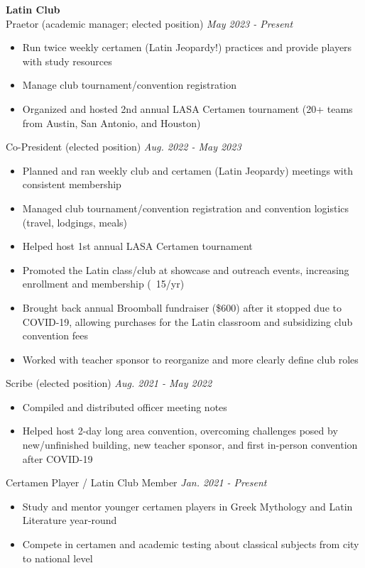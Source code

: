 \documentclass{article}
\begin{document}
\begin{flushleft}
    \textbf{Latin Club}\\
    Praetor (academic manager; elected position) \hfill \textsl{May 2023 - Present}
    \begin{itemize}
        \setlength\itemsep{-0.2em}
        \item Run twice weekly certamen (Latin Jeopardy!) practices and provide players with study resources
        \item Manage club tournament/convention registration
        \item Organized and hosted 2nd annual LASA Certamen tournament (20+ teams from Austin, San Antonio, and Houston)
    \end{itemize}
    Co-President (elected position) \hfill \textsl{Aug. 2022 - May 2023}
    \begin{itemize}
        \setlength\itemsep{-.2em}
        \item Planned and ran weekly club and certamen (Latin Jeopardy) meetings with consistent membership
        \item Managed club tournament/convention registration and convention logistics (travel, lodgings, meals)
        \item Helped host 1st annual LASA Certamen tournament
        \item Promoted the Latin class/club at showcase and outreach events, increasing enrollment and membership (~15/yr)
        \item Brought back annual Broomball fundraiser (\$600) after it stopped due to COVID-19, allowing purchases for the Latin classroom and subsidizing club convention fees
        \item Worked with teacher sponsor to reorganize and more clearly define club roles
    \end{itemize}
    Scribe (elected position) \hfill \textsl{Aug. 2021 - May 2022}
    \begin{itemize}
        \setlength\itemsep{-.2em}
        \item Compiled and distributed officer meeting notes
        \item Helped host 2-day long area convention, overcoming challenges posed by new/unfinished building, new teacher sponsor, and first in-person convention after COVID-19
    \end{itemize}
    Certamen Player / Latin Club Member \hfill \textsl{Jan. 2021 - Present}
    \begin{itemize}
        \setlength\itemsep{-.2em}
        \item Study and mentor younger certamen players in Greek Mythology and Latin Literature year-round
        \item Compete in certamen and academic testing about classical subjects from city to national level
    \end{itemize}


\end{flushleft}
\end{document}
